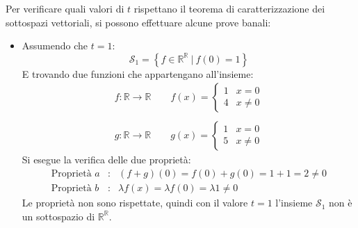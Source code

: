 \documentclass[a4paper]{article}
\begin{document}
	\noindent
	Per verificare quali valori di $t$ rispettano il teorema di caratterizzazione dei sottospazi vettoriali, si possono effettuare alcune prove banali:
	\begin{itemize}
		\item Assumendo che $t = 1$:
		\begin{equation*}
			\mathscr{S}_{1} = \left\{f \in \mathbb{R^{R}} \: | \: f\left(0\right) = 1\right\}
		\end{equation*}
		E trovando due funzioni che appartengano all'insieme:
		\begin{gather*}
			f : \mathbb{R} \rightarrow \mathbb{R} \hspace{2em} f\left(x\right) = \begin{cases}
				1 & x = 0 \\
				4 & x \ne 0
			\end{cases} \\
			\\
			g : \mathbb{R} \rightarrow \mathbb{R} \hspace{2em} g\left(x\right) = \begin{cases}
				1 & x = 0 \\
				5 & x \ne 0
			\end{cases}
		\end{gather*}
		Si esegue la verifica delle due proprietà:
		\begin{equation*}
			\begin{array}{lll}
				\text{Proprietà }a & : & \left(f + g\right)\left(0\right) = f\left(0\right) + g\left(0\right) = 1+1 = 2 \ne 0 \\ [0.5em]
				\text{Proprietà }b & : & \lambda f\left(x\right) = \lambda f\left(0\right) = \lambda 1 \ne 0
			\end{array}
		\end{equation*}
		Le proprietà non sono rispettate, quindi con il valore $t = 1$ l'insieme $\mathscr{S}_{1}$ non è un sottospazio di $\mathbb{R^{R}}$.
		

\end{itemize}
\end{document}

